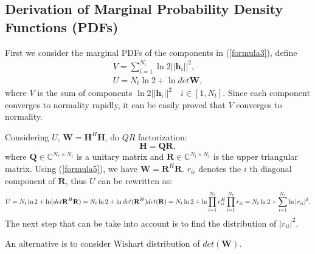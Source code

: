 \documentclass[12pt,letter,final]{article}
\begin{document}
\begin{spacing}{2.5}
\section{Derivation of Marginal Probability Density Functions (PDFs)}
First we consider the marginal PDFs of the components in (\ref{formula3}), define 
\begin{eqnarray}
V=\sum_{i=1}^{N_{t}}\ln{2||\mathbf{h}_{i}||^{2}},\\
U=N_{t}\ln{2}+\ln{det{\mathbf{W}}},
\label{formula4}
\end{eqnarray}
where $V$ is the sum of components $\ln{2||\mathbf{h}_{i}||^{2}}\quad i\in [1,N_{t}]$. Since each component converges to normality rapidly, it can be easily proved that $V$ converges to normality.

Considering $U$, $\mathbf{W}=\mathbf{H}^{H}\mathbf{H}$, do $QR$ factorization:
\begin{equation}
\mathbf{H}=\mathbf{Q}\mathbf{R},
\label{formula5} 
 \end{equation}
where $\mathbf{Q}\in\mathbb{C}^{N_{r}\times N_{t}}$ is a unitary matrix and $\mathbf{R}\in\mathbb{C}^{N_{t}\times N_{t}}$ is the upper triangular matrix. Using (\ref{formula5}), we have $\mathbf{W}=\mathbf{R}^{H}\mathbf{R}$. $r_{ii}$ denotes the $i$ th diagonal component of $\mathbf{R}$, thus $U$ can be rewritten as:
\begin{equation}
U=N_{t}\ln{2}+\ln(det{\mathbf{R}^{H}\mathbf{R}})=N_{t}\ln{2}+\ln{det(\mathbf{R}^{H})det(\mathbf{R})}\\=N_{t}\ln{2}+\ln{\prod_{i=1}^{N_{t}}r_{ii}^{H}\prod_{i=1}^{N_{t}}r_{ii}}=N_{t}\ln{2}+\sum_{i=1}^{N_{t}}\ln{|r_{ii}|^{2}}.
\label{formula6}
\end{equation}    
The next step that can be take into account is to find the distribution of $|r_{ii}|^{2}$.

An alternative is to consider Wishart distribution of $det(\mathbf{W})$.


\end{spacing}
\end{document}
